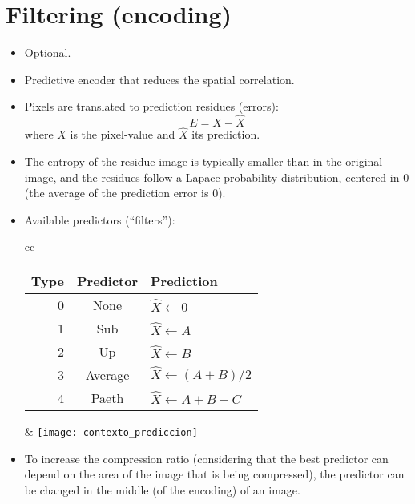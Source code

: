 \section{Filtering (encoding)}
\begin{itemize}
\item Optional.
\item Predictive encoder that reduces the spatial correlation.
\item Pixels are translated to prediction residues (errors):
  \begin{displaymath}
    E = X - \hat{X}
  \end{displaymath}
  where $X$ is the pixel-value and $\hat{X}$ its prediction.
\item The entropy of the residue image is typically smaller than in
  the original image, and the residues follow a
  \href{https://en.wikipedia.org/wiki/Laplace_distribution}{Lapace
    probability distribution}, centered in 0 (the average of the
  prediction error is 0).
\item Available predictors (``filters''):
  \begin{center}
    \begin{tabular}{cc}
      \begin{tabular}{rcl}
        Type & Predictor & Prediction \\
        \hline
        0 &	None 	& $\hat{X}\leftarrow 0$ \\
        1 &	Sub 	& $\hat{X}\leftarrow A$ \\
        2 &	Up 	& $\hat{X}\leftarrow B$ \\
        3 &	Average & $\hat{X}\leftarrow (A+B)/2$ \\
        4 &	Paeth 	& $\hat{X}\leftarrow A + B - C$
      \end{tabular}
      &
      \texttt{[image: contexto\_prediccion]}
    \end{tabular}
  \end{center}
\item To increase the compression ratio (considering that the best
  predictor can depend on the area of the image that is being
  compressed), the predictor can be changed in the middle (of the
  encoding) of an image.
\end{itemize}

